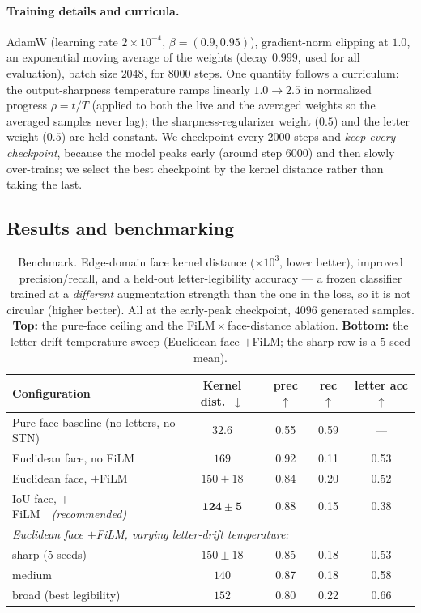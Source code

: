 \documentclass{article}
\begin{document}
\paragraph{Training details and curricula.}
\label{sec:train}
AdamW (learning rate $2{\times}10^{-4}$, $\beta=(0.9,0.95)$), gradient-norm clipping at $1.0$, an
exponential moving average of the weights (decay $0.999$, used for all evaluation), batch size $2048$,
for $8000$ steps. One quantity follows a curriculum: the output-sharpness temperature ramps linearly
$1.0\to2.5$ in normalized progress $\rho=t/T$ (applied to both the live and the averaged weights so the
averaged samples never lag); the sharpness-regularizer weight ($0.5$) and the letter weight ($0.5$) are
held constant. We checkpoint every $2000$ steps and \emph{keep every checkpoint}, because the model
peaks early (around step $6000$) and then slowly over-trains; we select the best checkpoint by the
kernel distance rather than taking the last.

\subsection{Results and benchmarking}
\label{sec:results}
\begin{table}[t]
  \caption{Benchmark. Edge-domain face kernel distance ($\times10^3$, lower better), improved
  precision/recall, and a held-out letter-legibility accuracy --- a frozen classifier trained at a
  \emph{different} augmentation strength than the one in the loss, so it is not circular (higher
  better). All at the early-peak checkpoint, $4096$ generated samples. \textbf{Top:} the pure-face
  ceiling and the FiLM\,$\times$\,face-distance ablation. \textbf{Bottom:} the letter-drift temperature
  sweep (Euclidean face $+$FiLM; the sharp row is a $5$-seed mean).}
  \label{tab:main}
  \centering\small
  \begin{tabular}{lcccc}
    \toprule
    Configuration & Kernel dist.\ $\downarrow$ & prec $\uparrow$ & rec $\uparrow$ & letter acc $\uparrow$ \\
    \midrule
    Pure-face baseline (no letters, no STN)          & $\mathbf{32.6}$ & 0.55 & 0.59 & --- \\
    \midrule
    Euclidean face, no FiLM                          & $169$ & 0.92 & 0.11 & 0.53 \\
    Euclidean face, $+$FiLM                          & $150{\pm}18$ & 0.84 & 0.20 & 0.52 \\
    IoU face, $+$FiLM~~\emph{(recommended)}          & $\mathbf{124{\pm}5}$ & 0.88 & 0.15 & 0.38 \\
    \midrule
    \multicolumn{5}{l}{\emph{Euclidean face $+$FiLM, varying letter-drift temperature:}}\\
    \quad sharp ($5$ seeds)                          & $150{\pm}18$ & 0.85 & 0.18 & 0.53 \\
    \quad medium                                     & $140$ & 0.87 & 0.18 & 0.58 \\
    \quad broad (best legibility)                    & $152$ & 0.80 & 0.22 & $\mathbf{0.66}$ \\
    \bottomrule
  \end{tabular}
\end{table}
\end{document}
